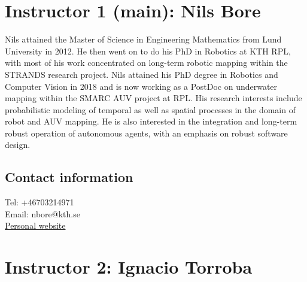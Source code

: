 \documentclass[
10pt, %
a4paper, %
oneside, %
BCOR5mm, %
]{scrartcl}
\title{\normalfont{Tutorial instructors}} %
\date{} %
\begin{document}
\renewcommand{\sectionmark}[1]{\markright{\spacedlowsmallcaps{#1}}} %
\lehead{\mbox{\llap{\small\thepage\kern1em\color{halfgray} \vline}\color{halfgray}\hspace{0.5em}\rightmark\hfil}} %

\pagestyle{scrheadings} %


\maketitle %

\section{Instructor 1 (main): Nils Bore} %
\label{sec:presenter_1_nils_bore}

Nils attained the Master of Science in Engineering Mathematics from Lund University in 2012. He then went on to do his PhD in Robotics at KTH RPL, with most of his work concentrated on long-term robotic mapping within the STRANDS research project.
Nils attained his PhD degree in Robotics and Computer Vision in 2018 and is now working as a PostDoc on underwater mapping within the SMARC AUV project at RPL.
His research interests include probabilistic modeling of temporal as well as spatial processes in the domain of robot and AUV mapping. He is also interested in the integration and long-term robust operation of autonomous agents, with an emphasis on robust software design.

\subsection{Contact information}
Tel: +46703214971
\\
Email: nbore@kth.se
\\
\href{https://www.kth.se/profile/nbore}{Personal website}

\section{Instructor 2: Ignacio Torroba} %
\label{sec:presenter_2_ignacio_torroba_balmori}
\end{document}
